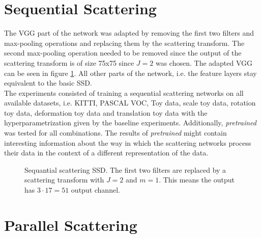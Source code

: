 \section{Sequential Scattering}

The VGG part of the network was adapted by removing the first two filters and max-pooling operations and replacing them by the scattering transform. The second max-pooling operation needed to be removed since the output of the scattering transform is of size 75x75 since $J=2$ was chosen. The adapted VGG can be seen in figure \ref{fig:sequential_scattering_SSD}. All other parts of the network, i.e. the feature layers stay equivalent to the basic SSD. \\
The experiments consisted of training a sequential scattering networks on all available datasets, i.e. KITTI, PASCAL VOC, Toy data, scale toy data, rotation toy data, deformation toy data and translation toy data with the hyperparametrization given by the baseline experiments. Additionally, \textit{pretrained} was tested for all combinations. The results of \textit{pretrained} might contain interesting information about the way in which the scattering networks process their data in the context of a different representation of the data.

\begin{figure}[!htb]
	\centering
	\caption{Sequantial scattering SSD. The first two filters are replaced by a scattering transform with $J=2$ and $m=1$. This means the output has $3 \cdot 17 =51$ output channel.}
	\label{fig:sequential_scattering_SSD}
\end{figure}

\section{Parallel Scattering}

